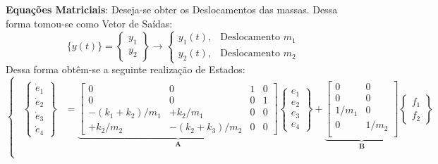 \documentclass{article}
\begin{document}
\begin{resolution}
    \textbf{Equações Matriciais}: Deseja-se obter os Deslocamentos das massas. Dessa forma tomou-se como Vetor de Saídas:
    \begin{equation*}
        \lbrace y(t) \rbrace = 
        \begin{Bmatrix} y_1\\ y_2 \end{Bmatrix} 
        \to 
        \begin{cases}
            y_1(t), &\text{Deslocamento $m_1$}\\
            y_2(t), &\text{Deslocamento $m_2$}
        \end{cases}
    \end{equation*}
    Dessa forma obtêm-se a seguinte realização de Estados:
    \begin{equation}
        \begin{cases}
        \begin{aligned}
            \begin{Bmatrix} \dot{e}_{1}\\ \dot{e}_{2}\\ \dot{e}_{3}\\ \dot{e}_{4} \end{Bmatrix} &=
            \underbrace{
            \begin{bmatrix}
                0 & 0 & 1 & 0\\
                0 & 0 & 0 & 1\\
                -(k_1 + k_2)/m_1 & +k_2/m_1 & 0 & 0\\
                +k_2/m_2 & -(k_2 + k_3)/m_2 & 0 & 0
            \end{bmatrix}}_{\mathbf{A}}
            \begin{Bmatrix} e_{1}\\ e_{2}\\ e_{3}\\ e_{4} \end{Bmatrix} + 
            \underbrace{
                \begin{bmatrix}
                    0 & 0\\
                    0 & 0\\
                    1/m_1 & 0\\
                    0 & 1/m_2\\
                \end{bmatrix}}_{\mathbf{B}}
            \begin{Bmatrix} f_1\\f_2 \end{Bmatrix}\\


\end{aligned}
\end{cases}
\end{equation}
\end{resolution}
\end{document}
